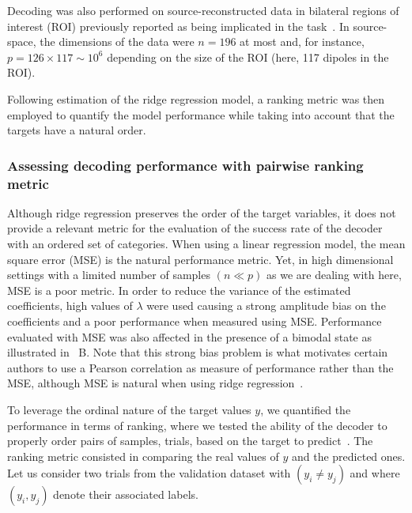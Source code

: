 Decoding was also performed on source-reconstructed data in bilateral regions of interest (ROI) previously reported as being implicated in the task~\cite{23zilber2014supramodal}. In source-space, the dimensions of the data were $n=196$ at most and, for instance, $p=126\times 117 \sim 10^6$ depending on the size of the ROI (here, 117 dipoles in the ROI).

Following estimation of the ridge regression model, a ranking metric was then employed to quantify the model performance while taking into account that the targets have a natural order.

\subsubsection*{Assessing decoding performance with pairwise ranking metric}
Although ridge regression preserves the order of the target variables, it does not provide a relevant metric for the evaluation of the success rate of the decoder with an ordered set of categories. When using a linear regression model, the mean square error (MSE) is the natural performance metric. Yet, in high dimensional settings with a limited number of samples $(n\ll p)$ as we are dealing with here, MSE is a poor metric. In order to reduce the variance of the estimated coefficients, high values of $\lambda$ were used causing a strong amplitude bias on the coefficients and a poor performance when measured using MSE. Performance evaluated with MSE was also affected in the presence of a bimodal state as illustrated in ~B. Note that this strong bias problem is what motivates certain authors to use a Pearson correlation as measure of performance rather than the MSE, although MSE is natural when using ridge regression~\cite{kay2008}.

To leverage the ordinal nature of the target values $y$, we quantified the performance in terms of ranking, where we tested the ability of the decoder to properly order pairs of samples, trials, based on the target to predict~\cite{herbrich00ordinal,Joachims:2002}. The ranking metric consisted in comparing the real values of $y$ and the predicted ones.
Let us consider two trials from the validation dataset with $(y_i \neq y_j)$ and where $(y_i, y_j)$ denote their associated labels.

